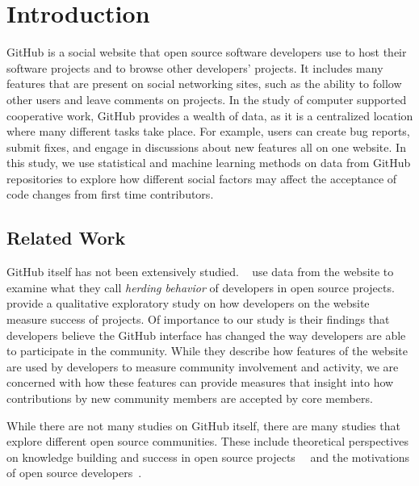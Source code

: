 \documentclass[12pt]{article}
\begin{document}
\maketitle

\section{Introduction}
GitHub is a social website that open source software developers use to host
their software projects and to browse other developers' projects. It includes
many features that are present on social networking sites, such as the ability
to follow other users and leave comments on projects. In the study of computer
supported cooperative work, GitHub provides a wealth of data, as it is a
centralized location where many different tasks take place. For example, users
can create bug reports, submit fixes, and engage in discussions about new
features all on one website.  In this study, we use statistical and machine
learning methods on data from GitHub repositories to explore how different
social factors may affect the acceptance of code changes from first time
contributors.

\subsection{Related Work}
GitHub itself has not been extensively studied. ~\cite{choi_herding_2013} use
data from the website to examine what they call \textit{herding behavior} of
developers in open source projects.  ~\cite{mcdonald_performance_2013} provide a
qualitative exploratory study on how developers on the website measure success
of projects. Of importance to our study is their findings that developers
believe the GitHub interface has changed the way developers are able to
participate in the community. While they describe how features of the website
are used by developers to measure community involvement and activity, we are
concerned with how these features can provide measures that insight into how
contributions by new community members are accepted by core members.

While there are not many studies on GitHub itself, there are many studies that
explore different open source communities. These include theoretical
perspectives on knowledge building and success in open source
projects~\cite{hemetsberger_learning_2006}~\cite{hemetsberger_collective_2009}
and the motivations of open source
developers~\cite{hertel_motivation_2003}\cite{lakhani_why_2003}.
\end{document}
